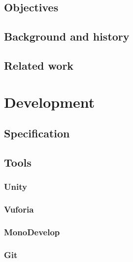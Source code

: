 \documentclass[BSP,english,oneside]{classes/gucthesis}
\begin{document}
	\chapter{Objectives}
		\label{chap:objectives}
		

	\chapter{Background and history}
		\label{chap:background}
		

	\chapter{Related work}
		\label{chap:related_work}
		


\part{Development}

	\chapter{Specification}
		\label{chap:specification}
		

	\chapter{Tools}
		\label{chap:tools}

		\section{Unity}
			

		\section{Vuforia}
			

		\section{MonoDevelop}
			

		\section{Git}
			
\end{document}
